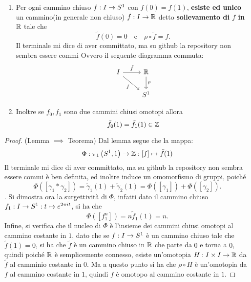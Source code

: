 \documentclass[]{article}
\begin{document}
\begin{lemma}  \nl
    \begin{enumerate}
        \item Per ogni cammino chiuso $f: I \to S^{1}$ con $f(0) = f(1)$, 
        \textbf{esiste ed unico} un cammino(in generale non chiuso) $\tilde{f}: I \to \mathbb{R}$ detto \textbf{sollevamento di $f$ in $\mathbb{R}$} tale che
        \[
            \tilde{f}(0) = 0 \quad \text{e} \quad \rho \circ \tilde{f} = f.
        \]Il terminale mi dice di aver committato, ma su github la repository non sembra essere commi
        Ovvero il seguente diagramma commuta:
        \[\begin{tikzcd}
            I & \R \\
            & {\Sph{1}}
            \arrow["{\tilde{f}}", from=1-1, to=1-2]
            \arrow["f"', from=1-1, to=2-2]
            \arrow["\rho", from=1-2, to=2-2]
        \end{tikzcd}\]
        \item Inoltre se $f_0, f_1$ sono due cammini chiusi omotopi allora
        \[
            \tilde{f}_0(1) = \tilde{f}_1(1) \in \mathbb{Z}
        \] 
    \end{enumerate}
\end{lemma}

\begin{proof} (Lemma $\implies$ Teorema) \nl
    Dal lemma segue che la mappa:
    \[
        \Phi: \pi_1\left(S^{1}, 1\right) \to \mathbb{Z}: [f] \mapsto \tilde{f}(1)
    \]Il terminale mi dice di aver committato, ma su github la repository non sembra essere commi
    \`e ben definita, ed inoltre induce un omomorfismo di gruppi, poich\'e
    \[
        \Phi\left([\gamma_1 * \gamma_2]\right) = \tilde{\gamma}_1(1) + \tilde{\gamma}_2(1) = \Phi\left([\gamma_1]\right) + \Phi\left([\gamma_2]\right).
    \].
    Si dimostra ora la surgettivit\`a di $\Phi$, infatti dato il cammino chiuso $f_1: I \to S^{1}: t \mapsto e^{2\pi i t}$, si ha che
    \[
        \Phi\left([f_1^n]\right) = n \tilde{f}_1(1) = n.
    \]
    Infine, si verifica che il nucleo di $\Phi$ \`e l'insieme dei cammini chiusi omotopi al cammino costante in $1$, dato che
    se $f: I \to S^{1}$ \`e un cammino chiuso tale che $\tilde{f}(1) = 0$, si ha che $\tilde{f}$ \`e un cammino chiuso in $\mathbb{R}$ che parte da $0$ e torna a $0$, quindi
    poich\'e $\mathbb{R}$ \`e semplicemente connesso, esiste un'omotopia $H: I \times I \to \mathbb{R}$ da $\tilde{f}$ al camminio costante in $0$.
    Ma a questo punto si ha che $\rho \circ H$ è un'omotopia da $f$ al cammino costante in $1$, quindi $f$ è omotopo al cammino costante in $1$.
\end{proof}
\end{document}
